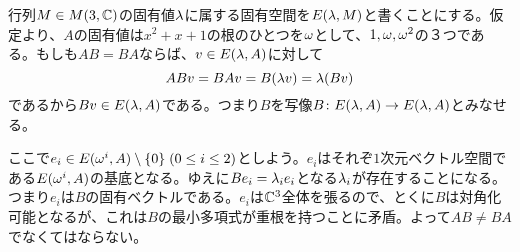 \subsubsection{} %
\begin{sol}
  行列$M \in M(3,{\mathbb C})$の固有値${\lambda}$に属する固有空間を$E({\lambda}, M)$と書くことにする。仮定より、$A$の固有値は$x^2 + x + 1$の根のひとつを${\omega}$として、$1,{\omega}, {\omega}^2$の３つである。もしも$AB =BA$ならば、$v \in E({\lambda},A)$に対して
  \[
AB v = BA v = B({\lambda} v) = {\lambda} (B v)
  \]
  であるから$Bv \in E({\lambda},A)$である。つまり$B$を写像$B \colon E({\lambda},A) \to E({\lambda},A)$とみなせる。

  ここで$e_i \in E({\omega}^i,A) \setminus \{ 0 \} \; (0 \leq i \leq 2)$としよう。$e_i$はそれぞ$1$次元ベクトル空間である$E({\omega}^i,A)$の基底となる。ゆえに$B e_i = {\lambda}_i e_i$となる${\lambda}_i$が存在することになる。つまり$e_i$は$B$の固有ベクトルである。$e_i$は${\mathbb C}^3$全体を張るので、とくに$B$は対角化可能となるが、これは$B$の最小多項式が重根を持つことに矛盾。よって$AB \neq BA$でなくてはならない。
\end{sol}
\newpage


